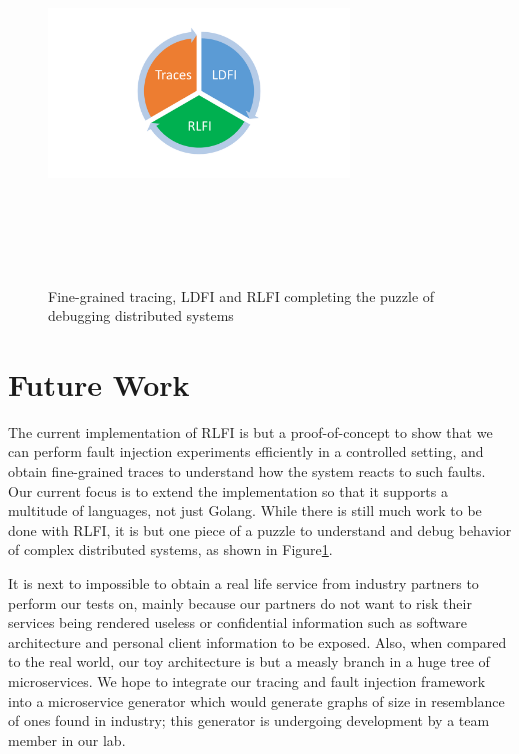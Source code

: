 \documentclass[letterpaper,twocolumn,10pt]{article}
\begin{document}
\begin{figure}
\centering
\includegraphics[width=8cm,height=10cm,keepaspectratio=true]{puzzle}
\caption{Fine-grained tracing, LDFI and RLFI completing the puzzle of debugging distributed systems}
\label{puzzle}
\end{figure}

\section{Future Work}
The current implementation of RLFI is but a proof-of-concept to show that we can perform fault injection experiments efficiently in a controlled setting, and obtain fine-grained traces to understand how the system reacts to such faults. Our current focus is to extend the implementation so that it supports a multitude of languages, not just Golang. While there is still much work to be done with RLFI, it is but one piece of a puzzle to understand and debug behavior of complex distributed systems, as shown in Figure\ref{puzzle}.

It is next to impossible to obtain a real life service from industry partners to perform our tests on, mainly because our partners do not want to risk their services being rendered useless or confidential information such as software architecture and personal client information to be exposed. Also, when compared to the real world, our toy architecture is but a measly branch in a huge tree of microservices. We hope to integrate our tracing and fault injection framework into a microservice generator which would generate graphs of size in resemblance of ones found in industry; this generator is undergoing development by a team member in our lab.
\end{document}
